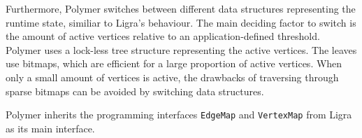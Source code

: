 Furthermore, Polymer switches between different data structures representing the runtime state, similiar to Ligra's behaviour. The main deciding factor to switch is the amount of active vertices relative to an application-defined threshold. Polymer uses a lock-less tree structure representing the active vertices. The leaves use bitmaps, which are efficient for a large proportion of active vertices. When only a small amount of vertices is active, the drawbacks of traversing through sparse bitmaps can be avoided by switching data structures.

Polymer inherits the programming interfaces \texttt{EdgeMap} and \texttt{VertexMap} from Ligra as its main interface.
